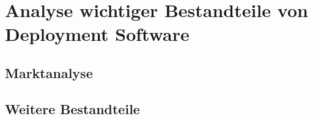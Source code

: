 \chapter{Analyse wichtiger Bestandteile von Deployment Software}

\section{Marktanalyse}


\section{Weitere Bestandteile}
